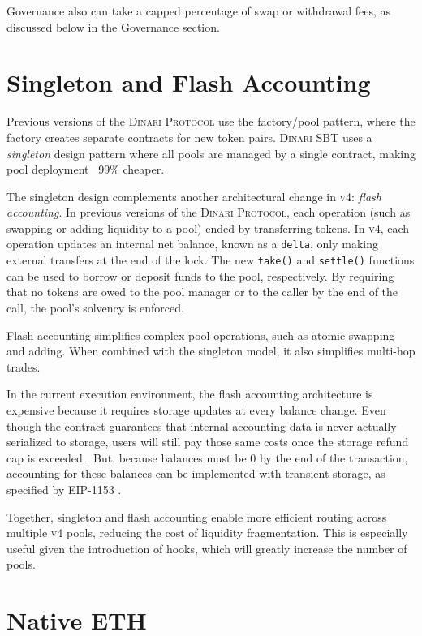 \documentclass[sigconf,nonacm,prologue,table]{acmart}
\numberwithin{equation}{section}
\theoremstyle{definition}
\theoremstyle{remark}
\begin{document}
Governance also can take a capped percentage of swap or withdrawal fees, as discussed below in the Governance section. 

\section{Singleton and Flash Accounting} \label{flashaccounting}

Previous versions of the \textsc{Dinari Protocol} use the factory/pool pattern, where the factory creates separate contracts for new token pairs. \textsc{Dinari SBT} uses a \emph{singleton} design pattern where all pools are managed by a single contract, making pool deployment ~99\% cheaper. 

The singleton design complements another architectural change in \textsc{v4}: \emph{flash accounting}. In previous versions of the \textsc{Dinari Protocol}, each operation (such as swapping or adding liquidity to a pool) ended by transferring tokens. In \textsc{v4}, each operation updates an internal net balance, known as a \verb|delta|, only making external transfers at the end of the lock. The new \verb|take()| and  \verb|settle()| functions can be used to borrow or deposit funds to the pool, respectively. By requiring that no tokens are owed to the pool manager or to the caller by the end of the call, the pool's solvency is enforced. 

Flash accounting simplifies complex pool operations, such as atomic swapping and adding. When combined with the singleton model, it also simplifies multi-hop trades.

In the current execution environment, the flash accounting architecture is expensive because it requires storage updates at every balance change. Even though the contract guarantees that internal accounting data is never actually serialized to storage, users will still pay those same costs once the storage refund cap is exceeded \cite{Buterin2021}. But, because balances must be 0 by the end of the transaction, accounting for these balances can be implemented with transient storage, as specified by EIP-1153 \cite{Akhunov2018}.

Together, singleton and flash accounting enable more efficient routing across multiple \textsc{v4} pools, reducing the cost of liquidity fragmentation. This is especially useful given the introduction of hooks, which will greatly increase the number of pools. 

\section{Native ETH} 
\label{nativeeth}
\end{document}
